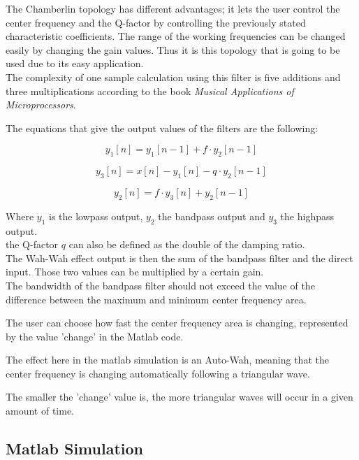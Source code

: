 The Chamberlin topology has different advantages; it lets the user control the center frequency and the Q-factor by controlling the previously stated characteristic coefficients. The range of the working frequencies can be changed easily by changing the gain values. Thus it is this topology that is going to be used due to its easy application. \\

The complexity of one sample calculation using this filter is five additions and three multiplications according to the book \textit{Musical Applications of Microprocessors}. 

The equations that give the output values of the filters are the following:

\begin{equation}
   			y_{1}[n] = y_{1}[n-1] + f \cdot y_{2}[n-1]
\end{equation}

\begin{equation}
            y_{3}[n] = x[n]  - y_{1}[n]   - q \cdot y_{2}[n-1]
\end{equation}

\begin{equation}
           y_{2}[n] = f \cdot y_{3}[n] + y_{2}[n-1]
\end{equation}

Where $y_{1}$ is the lowpass output, $y_{2}$ the bandpass output and $y_{3}$ the highpass output. \\
the Q-factor $q$ can also be defined as the double of the damping ratio. \\

The Wah-Wah effect output is then the sum of the bandpass filter and the direct input. Those two values can be multiplied by a certain gain. \\


The bandwidth of the bandpass filter should not exceed the value of the difference between the maximum and minimum center frequency area. 


The user can choose how fast the center frequency area is changing, represented by the value 'change' in the Matlab code.  

The effect here in the matlab simulation is an Auto-Wah, meaning that the center frequency is changing automatically following a triangular wave. 

The smaller the 'change' value is, the more triangular waves will occur in a given amount of time.  

\subsection{Matlab Simulation}

